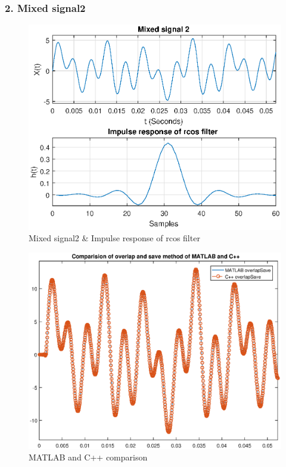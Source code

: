 \subsubsection{2. Mixed signal2}
\begin{figure}[h]
	\centering
	\includegraphics[width=12cm]{./algorithms/overlap_save/figures/mixed_signal2.eps}
	\caption{Mixed signal2 \& Impulse response of rcos filter}\label{mixed_signal2}
\end{figure}

\begin{figure}[h]
	\centering
	\includegraphics[width=13cm]{./algorithms/overlap_save/figures/mixed_signal2_matlab_and_C++.eps}
	\caption{MATLAB and C++ comparison}\label{mixed_signal2_matlab_and_C++}
\end{figure}

